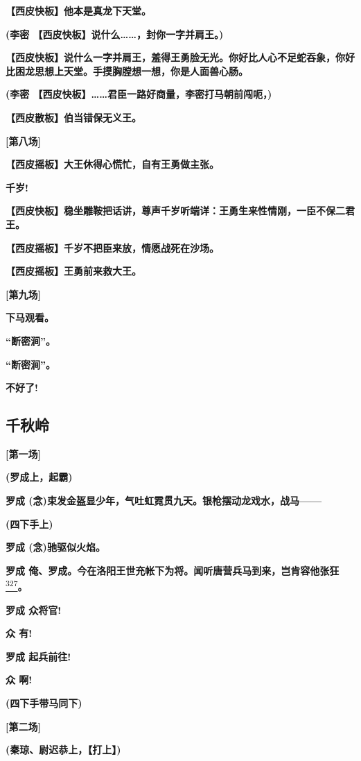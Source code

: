 \textbf{【西皮快板】他本是真龙下天堂。}

\textbf{(李密 【西皮快板】说什么\ldots{}\ldots{}，封你一字并肩王。)}

\textbf{【西皮快板】说什么一字并肩王，羞得王勇脸无光。你好比人心不足蛇吞象，你好比困龙思想上天堂。手摸胸膛想一想，你是人面兽心肠。}

\textbf{(李密
【西皮快板】\ldots{}\ldots{}君臣一路好商量，李密打马朝前闯呃，)}

\textbf{【西皮散板】伯当错保无义王。}

\textbf{{[}第八场{]}}

\textbf{【西皮摇板】大王休得心慌忙，自有王勇做主张。}

\textbf{千岁!}

\textbf{【西皮快板】稳坐雕鞍把话讲，尊声千岁听端详：王勇生来性情刚，一臣不保二君王。}

\textbf{【西皮摇板】千岁不把臣来放，情愿战死在沙场。}

\textbf{【西皮摇板】王勇前来救大王。}

\textbf{{[}第九场{]}}

\textbf{下马观看。}

\textbf{``断密涧''。}

\textbf{``断密涧''。}

\textbf{不好了!}

\hypertarget{ux5343ux79cbux5cad}{%
\subsection{千秋岭}\label{ux5343ux79cbux5cad}}

\textbf{{[}第一场{]}}

\textbf{(罗成上，起霸)}

\textbf{罗成
(念)束发金盔显少年，气吐虹霓贯九天。银枪摆动龙戏水，战马------}

\textbf{(四下手上)}

\textbf{罗成 (念)驰驱似火焰。}

\textbf{罗成
俺、罗成。今在洛阳王世充帐下为将。闻听唐营兵马到来，岂肯容他张狂}\protect\hyperlink{fn327}{\textsuperscript{327}}\textbf{。}

\textbf{罗成 众将官!}

\textbf{众 有!}

\textbf{罗成 起兵前往!}

\textbf{众 啊!}

\textbf{(四下手带马同下)}

\textbf{{[}第二场{]}}

\textbf{(秦琼、尉迟恭上，【打上】)}

